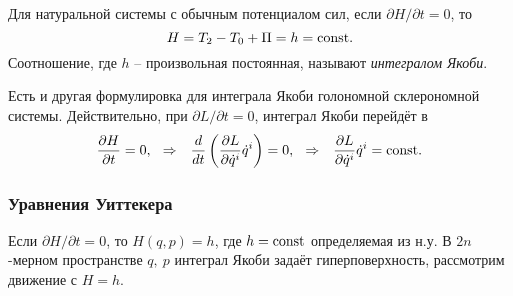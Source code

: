 \begin{to_def} 
    Для натуральной системы с обычным потенциалом сил, если $\partial H/ \partial t =0$, то
    \begin{equation*}
         H = T_2 - T_0 + \Pi = h = \text{const}.
     \end{equation*} 
     Соотношение, где $h$ -- произвольная постоянная, называют \textit{интегралом Якоби}.
\end{to_def}

Есть и другая формулировка для интеграла Якоби голономной склерономной системы. Действительно, при $\partial L / \partial t = 0$, интеграл Якоби перейдёт в
\begin{equation*}
    \frac{\partial H}{\partial t} = 0,
    \hspace{0.25cm} \Rightarrow \hspace{0.25cm} 
    \frac{d }{d t} \left(
        \frac{\partial L}{\partial \dot{q}^i} \dot{q}^i
    \right) = 0,
    \hspace{0.25cm} \Rightarrow \hspace{0.25cm} 
    \frac{\partial L}{\partial \dot{q}^i} \dot{q}^i = \text{const}.
\end{equation*}



\subsubsection*{Уравнения Уиттекера}


Если $\partial H / \partial t = 0$, то $H(q, p) = h$, где $h = \text{const}$ определяемая из н.у. В $2n$-мерном пространстве $q, \ p$ интеграл Якоби задаёт гиперповерхность, рассмотрим движение с $H = h$.

